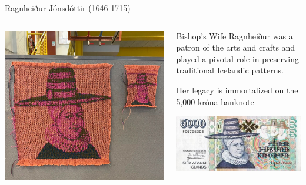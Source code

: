\documentclass[
    NAME={Dr. Helga Ingimundardóttir},
    EMAIL={helgaingim@hi.is},
    FACULTY={Industrial Engineering},
    TITLE={HiDef Textiles: Reviving Tradition with Innovation},
    SUBTITLE={Empowering Creativity and Sustainability in Textile Production through Digital Transformation},
    SEMINAR={Reykjavík DataBeers},
    DATE={January 25, 2025},
    WIDE={true}
]{HI-LaTeX/hi-beamer}
\begin{document}
    \begin{frame}{Ragnheiður Jónsdóttir (1646-1715)}
        \begin{columns}
            \begin{column}{.5\linewidth}
                \includegraphics[width=\linewidth]{include/ragnheidur.png}
            \end{column}
            \begin{column}{.5\linewidth}
                \begin{block}{Bishop's Wife}
                    Ragnheiður was a patron of the arts and crafts and played a pivotal role in preserving traditional Icelandic patterns.

                    Her legacy is immortalized on the 5,000 króna banknote
                \end{block}
                \centering
                \includegraphics[width=.7\linewidth]{include/5000kr.JPG}
            \end{column}
        \end{columns}
    \end{frame}
\end{document}
